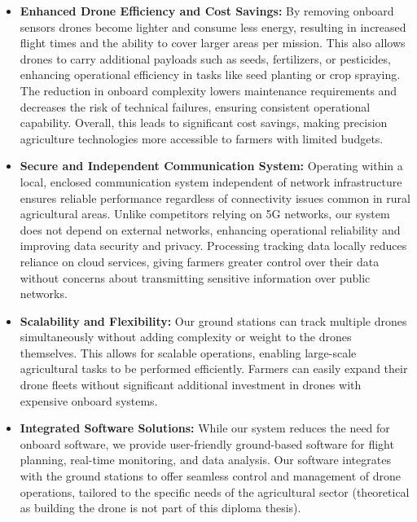 \begin{itemize} 
	\item \textbf{Enhanced Drone Efficiency and Cost Savings:} By removing onboard sensors drones become lighter and consume less energy, resulting in increased flight times and the ability to cover larger areas per mission. This also allows drones to carry additional payloads such as seeds, fertilizers, or pesticides, enhancing operational efficiency in tasks like seed planting or crop spraying. The reduction in onboard complexity lowers maintenance requirements and decreases the risk of technical failures, ensuring consistent operational capability. Overall, this leads to significant cost savings, making precision agriculture technologies more accessible to farmers with limited budgets.
	
	\item \textbf{Secure and Independent Communication System:} Operating within a local, enclosed communication system independent of network infrastructure ensures reliable performance regardless of connectivity issues common in rural agricultural areas. Unlike competitors relying on 5G networks, our system does not depend on external networks, enhancing operational reliability and improving data security and privacy. Processing tracking data locally reduces reliance on cloud services, giving farmers greater control over their data without concerns about transmitting sensitive information over public networks.
	
	\item \textbf{Scalability and Flexibility:} Our ground stations can track multiple drones simultaneously without adding complexity or weight to the drones themselves. This allows for scalable operations, enabling large-scale agricultural tasks to be performed efficiently. Farmers can easily expand their drone fleets without significant additional investment in drones with expensive onboard systems.
	
	\item \textbf{Integrated Software Solutions:} While our system reduces the need for onboard software, we provide user-friendly ground-based software for flight planning, real-time monitoring, and data analysis. Our software integrates with the ground stations to offer seamless control and management of drone operations, tailored to the specific needs of the agricultural sector (theoretical as building the drone is not part of this diploma thesis).
\end{itemize}

